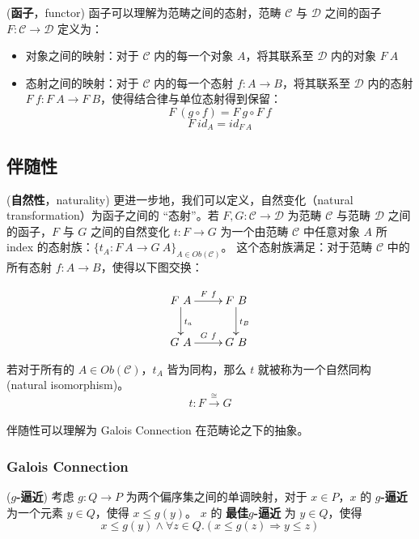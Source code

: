 \begin{defn} (\textbf{函子}，functor)
函子可以理解为范畴之间的态射，范畴 $\mathcal{C}$ 与 $\mathcal{D}$ 之间的函子 $F : \mathcal{C} \rightarrow \mathcal{D}$ 定义为：
\begin{itemize}
    \item 对象之间的映射：对于 $\mathcal{C}$ 内的每一个对象 $A$，将其联系至 $\mathcal{D}$ 内的对象 $F\ A$
    \item 态射之间的映射：对于 $\mathcal{C}$ 内的每一个态射 $f : A \rightarrow B$，将其联系至 $\mathcal{D}$ 内的态射 $F\ f : F\ A \rightarrow F\ B$，使得结合律与单位态射得到保留：
    \[ F\ (g \circ f) = F\ g \circ F\ f\]
    \[ F\ id_{A} = id_{F\ A}\]
\end{itemize}


\subsection{伴随性}

\begin{defn} (\textbf{自然性}，naturality)
更进一步地，我们可以定义，自然变化（natural transformation）为函子之间的 ``态射''。若 $F, G : \mathcal{C} \rightarrow \mathcal{D}$ 为范畴 $\mathcal{C}$ 与范畴 $\mathcal{D}$ 之间的函子，$F$ 与 $G$ 之间的自然变化 $t : F \rightarrow G$ 为一个由范畴 $\mathcal{C}$ 中任意对象 $A$ 所 index 的态射族：${\{t_A : F\ A \rightarrow G\ A\}}_{A\in Ob(\mathcal{C})}$。 这个态射族满足：对于范畴 $\mathcal{C}$ 中的所有态射 $f : A \rightarrow B$，使得以下图交换：

\[\xymatrix{
F\ A  \ar[d]^{t_a}  \ar[r]^{F\ f} & F\ B \ar[d]^{t_B}\\
G\ A  \ar[r]^{G\ f} & G\ B
}\]

若对于所有的 $A \in Ob(\mathcal{C})$，$t_A$ 皆为同构，那么 $t$ 就被称为一个自然同构 (natural isomorphism)。
\[ t : F \overset{\cong}\longrightarrow G \]\\

伴随性可以理解为 Galois Connection 在范畴论之下的抽象。\\

\subsubsection{Galois Connection}

\begin{defn} (\textbf{$g$-逼近})
考虑 $g : Q \rightarrow P$ 为两个偏序集之间的单调映射，对于 $x \in P$，$x$ 的 \textbf{$g$-逼近} 为一个元素 $y \in Q$，使得 $x \le g(y)$。
$x$ 的 \textbf{最佳$g$-逼近} 为 $y \in Q$，使得
\[ x \le g(y) \wedge \forall z \in Q . (x \le g(z) \Rightarrow y \le z) \]


\end{defn}
\end{defn}
\end{defn}
